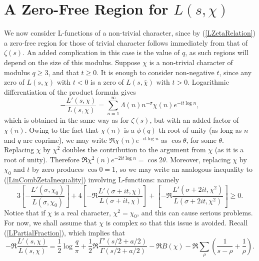 \section{A Zero-Free Region for \texorpdfstring{$L(s, \chi)$}{Lg}}
We now consider L-functions of a non-trivial character, since by (\ref{LZetaRelation}) a zero-free region for those of trivial character follows immediately from that of $\zeta(s)$. An added complication in this case is the value of $q$, as such regions will depend on the size of this modulus. Suppose $\chi$ is a non-trivial character of modulus $q \geq 3$, and that $t \geq 0$. It is enough to consider non-negative $t$, since any zero of $L(s, \chi)$ with $t < 0$ is a zero of $L(s, \overline{\chi})$ with $t > 0$. Logarithmic differentiation of the product formula gives 
\begin{equation}
\label{LoverLExplicit}
    -\frac{L'(s, \chi)}{L(s, \chi)} = \sum_{n=1}^{\infty}\Lambda(n) n^{-\sigma}\chi(n)e^{-i t \log n},
\end{equation}
which is obtained in the same way as for $\zeta(s)$, but with an added factor of $\chi(n)$. Owing to the fact that $\chi(n)$ is a $\phi(q)$-th root of unity (as long as $n$ and $q$ are coprime), we may write $\mathfrak{R}\chi(n)e^{-i t \log n}$ as $\cos\theta$, for some $\theta$. Replacing $\chi$ by $\chi^{2}$ doubles the contribution to the argument from $\chi$ (as it is a root of unity). Therefore $\mathfrak{R}\chi^{2}(n)e^{-2 i t \log n} = \cos 2\theta$. Moreover, replacing $\chi$ by $\chi_0$ and $t$ by zero produces $\cos 0 = 1$, so we may write an analogous inequality to (\ref{LinCombZetaInequality}) involving L-functions: namely
\begin{equation}
\label{LinCombLRelation}
    3\left[-\frac{L'(\sigma, \chi_0)}{L(\sigma, \chi_0)} \right] + 4\left[-\mathfrak{R} \frac{L'(\sigma + i t, \chi)}{L(\sigma + i t, \chi)} \right] + \left[-\mathfrak{R} \frac{L'(\sigma + 2i t, \chi^{2})}{L(\sigma + 2i t, \chi^{2})} \right] \geq 0.
\end{equation}
Notice that if $\chi$ is a real character, $\chi^{2} = \chi_0$, and this can cause serious problems. For now, we shall assume that $\chi$ is complex so that this issue is avoided. Recall (\ref{LPartialFraction}), which implies that 
\begin{equation}
\label{RealLogDiffL}
    -\mathfrak{R}\frac{L'(s, \chi)}{L(s, \chi)} = \frac12 \log\frac{q}{\pi} + \frac12 \mathfrak{R}\frac{\Gamma'(s/2 + a/2)}{\Gamma(s/2 + a/2)} - \mathfrak{R}B(\chi) - \mathfrak{R}\sum_{\rho} \left( \frac{1}{s - \rho} + \frac{1}{\rho} \right). \nonumber
\end{equation}
